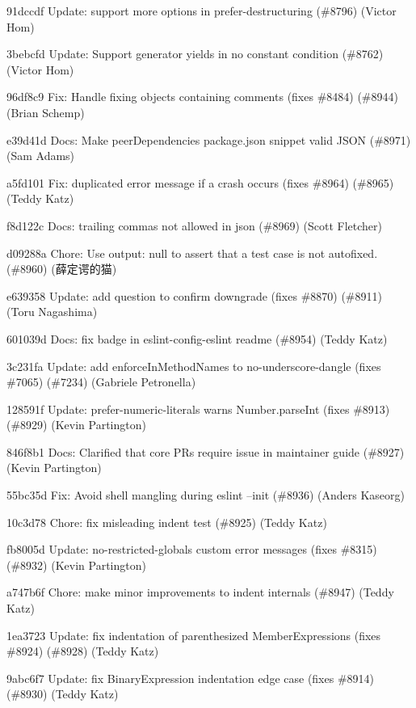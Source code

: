 \begin{DoxyItemize}
\item 91dccdf Update\+: support more options in prefer-\/destructuring (\#8796) (Victor Hom)
\item 3bebcfd Update\+: Support generator yields in no constant condition (\#8762) (Victor Hom)
\item 96df8c9 Fix\+: Handle fixing objects containing comments (fixes \#8484) (\#8944) (Brian Schemp)
\item e39d41d Docs\+: Make {\ttfamily peer\+Dependencies} package.\+json snippet valid JSON (\#8971) (Sam Adams)
\item a5fd101 Fix\+: duplicated error message if a crash occurs (fixes \#8964) (\#8965) (Teddy Katz)
\item f8d122c Docs\+: trailing commas not allowed in json (\#8969) (Scott Fletcher)
\item d09288a Chore\+: Use {\ttfamily output\+: null} to assert that a test case is not autofixed. (\#8960) (薛定谔的猫)
\item e639358 Update\+: add question to confirm downgrade (fixes \#8870) (\#8911) (Toru Nagashima)
\item 601039d Docs\+: fix badge in eslint-\/config-\/eslint readme (\#8954) (Teddy Katz)
\item 3c231fa Update\+: add enforce\+In\+Method\+Names to no-\/underscore-\/dangle (fixes \#7065) (\#7234) (Gabriele Petronella)
\item 128591f Update\+: prefer-\/numeric-\/literals warns Number.\+parse\+Int (fixes \#8913) (\#8929) (Kevin Partington)
\item 846f8b1 Docs\+: Clarified that core PRs require issue in maintainer guide (\#8927) (Kevin Partington)
\item 55bc35d Fix\+: Avoid shell mangling during eslint --init (\#8936) (Anders Kaseorg)
\item 10c3d78 Chore\+: fix misleading {\ttfamily indent} test (\#8925) (Teddy Katz)
\item fb8005d Update\+: no-\/restricted-\/globals custom error messages (fixes \#8315) (\#8932) (Kevin Partington)
\item a747b6f Chore\+: make minor improvements to {\ttfamily indent} internals (\#8947) (Teddy Katz)
\item 1ea3723 Update\+: fix indentation of parenthesized Member\+Expressions (fixes \#8924) (\#8928) (Teddy Katz)
\item 9abc6f7 Update\+: fix Binary\+Expression indentation edge case (fixes \#8914) (\#8930) (Teddy Katz)

\end{DoxyItemize}
